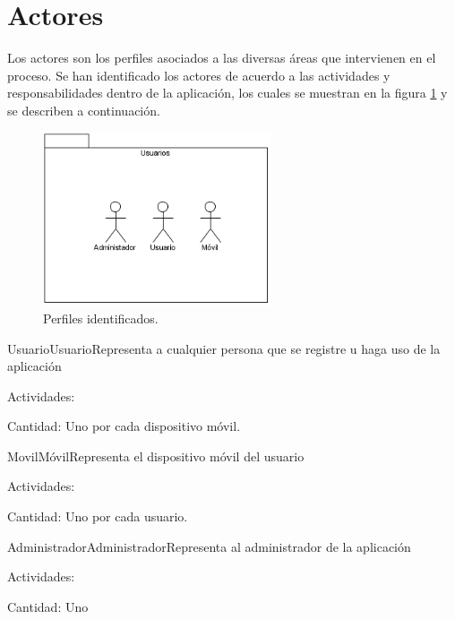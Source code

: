 \newpage
\section{Actores}

Los actores son los perfiles asociados a las diversas áreas que intervienen en el proceso. Se han identificado los actores de acuerdo a las actividades y responsabilidades dentro de la aplicación, los cuales se muestran en la figura \ref{fig:perfiles} y se describen a continuación.


    \begin{figure}[htbp!]
      \begin{center}
      \includegraphics[width=0.6\textwidth]{ModeloComportamiento/imagenes/Actores.png}
      \caption{Perfiles identificados.}
      \label{fig:perfiles}
      \end{center}
    \end{figure}

\begin{actor}{Usuario}{Usuario}{Representa a cualquier persona que se registre u haga uso de la aplicación}
	\item[Actividades:]
	\item[Cantidad:] Uno por cada dispositivo móvil.
	
\end{actor}


\begin{actor}{Movil}{Móvil}{Representa el dispositivo móvil del usuario}
	\item[Actividades:]
	\item[Cantidad:] Uno por cada usuario.
	
\end{actor}

\begin{actor}{Administrador}{Administrador}{Representa al administrador de la aplicación}
	\item[Actividades:]
	\item[Cantidad:] Uno
	
\end{actor}